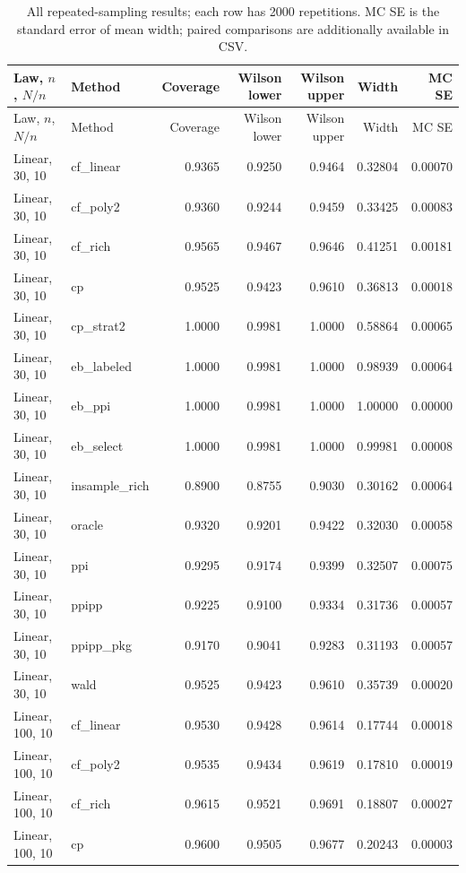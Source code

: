 \begin{longtable}{llrrrrr}
\caption{All repeated-sampling results; each row has 2000 repetitions. MC SE is the standard error of mean width; paired comparisons are additionally available in CSV.}\label{tab:full}\\
\toprule
Law, $n$, $N/n$ & Method & Coverage & Wilson lower & Wilson upper & Width & MC SE \\
\midrule\endfirsthead
\toprule Law, $n$, $N/n$ & Method & Coverage & Wilson lower & Wilson upper & Width & MC SE \\\midrule\endhead
Linear, 30, 10 & cf\_linear & 0.9365 & 0.9250 & 0.9464 & 0.32804 & 0.00070 \\
Linear, 30, 10 & cf\_poly2 & 0.9360 & 0.9244 & 0.9459 & 0.33425 & 0.00083 \\
Linear, 30, 10 & cf\_rich & 0.9565 & 0.9467 & 0.9646 & 0.41251 & 0.00181 \\
Linear, 30, 10 & cp & 0.9525 & 0.9423 & 0.9610 & 0.36813 & 0.00018 \\
Linear, 30, 10 & cp\_strat2 & 1.0000 & 0.9981 & 1.0000 & 0.58864 & 0.00065 \\
Linear, 30, 10 & eb\_labeled & 1.0000 & 0.9981 & 1.0000 & 0.98939 & 0.00064 \\
Linear, 30, 10 & eb\_ppi & 1.0000 & 0.9981 & 1.0000 & 1.00000 & 0.00000 \\
Linear, 30, 10 & eb\_select & 1.0000 & 0.9981 & 1.0000 & 0.99981 & 0.00008 \\
Linear, 30, 10 & insample\_rich & 0.8900 & 0.8755 & 0.9030 & 0.30162 & 0.00064 \\
Linear, 30, 10 & oracle & 0.9320 & 0.9201 & 0.9422 & 0.32030 & 0.00058 \\
Linear, 30, 10 & ppi & 0.9295 & 0.9174 & 0.9399 & 0.32507 & 0.00075 \\
Linear, 30, 10 & ppipp & 0.9225 & 0.9100 & 0.9334 & 0.31736 & 0.00057 \\
Linear, 30, 10 & ppipp\_pkg & 0.9170 & 0.9041 & 0.9283 & 0.31193 & 0.00057 \\
Linear, 30, 10 & wald & 0.9525 & 0.9423 & 0.9610 & 0.35739 & 0.00020 \\
Linear, 100, 10 & cf\_linear & 0.9530 & 0.9428 & 0.9614 & 0.17744 & 0.00018 \\
Linear, 100, 10 & cf\_poly2 & 0.9535 & 0.9434 & 0.9619 & 0.17810 & 0.00019 \\
Linear, 100, 10 & cf\_rich & 0.9615 & 0.9521 & 0.9691 & 0.18807 & 0.00027 \\
Linear, 100, 10 & cp & 0.9600 & 0.9505 & 0.9677 & 0.20243 & 0.00003 \\

\end{longtable}
